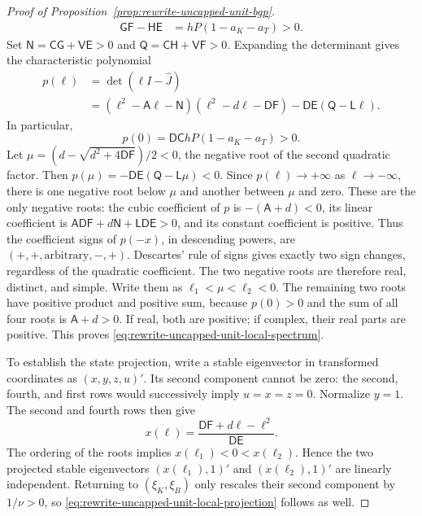 \begin{proof}[Proof of Proposition~\ref{prop:rewrite-uncapped-unit-bgp}]
\begin{align}
 \mathsf G\mathsf F-\mathsf H\mathsf E
 &=hP(1-a_K-a_T)>0.
 \label{eq:rewrite-uncapped-unit-local-minor}
\end{align}
Set $\mathsf N=\mathsf C\mathsf G+\mathsf V\mathsf E>0$ and
$\mathsf Q=\mathsf C\mathsf H+\mathsf V\mathsf F>0$.
Expanding the determinant gives the characteristic polynomial
\begin{equation}
 \begin{split}
 p(\ell)&=\det(\ell I-\widehat J)\\
 &=(\ell^2-\mathsf A\ell-\mathsf N)
 (\ell^2-d\ell-\mathsf D\mathsf F)
 -\mathsf D\mathsf E(\mathsf Q-\mathsf L\ell).
 \end{split}
 \label{eq:rewrite-uncapped-unit-local-polynomial}
\end{equation}
In particular,
\[
 p(0)=\mathsf D\mathsf C hP(1-a_K-a_T)>0.
\]
Let $\mu=(d-\sqrt{d^2+4\mathsf D\mathsf F})/2<0$, the negative
root of the second quadratic factor. Then
$p(\mu)=-\mathsf D\mathsf E(\mathsf Q-\mathsf L\mu)<0$.
Since $p(\ell)\to+\infty$ as $\ell\to-\infty$, there is one
negative root below $\mu$ and another between $\mu$ and zero.
These are the only negative roots: the cubic coefficient of $p$ is
$-(\mathsf A+d)<0$, its linear coefficient is
$\mathsf A\mathsf D\mathsf F+d\mathsf N+\mathsf L\mathsf D\mathsf E>0$,
and its constant coefficient is positive. Thus the coefficient signs of
$p(-x)$, in descending powers, are $(+,+,\text{arbitrary},-,+)$.
Descartes' rule of signs gives exactly two sign changes, regardless of
the quadratic coefficient. The two negative roots are therefore real,
distinct, and simple. Write them as $\ell_1<\mu<\ell_2<0$.
The remaining two roots have positive product and positive sum, because
$p(0)>0$ and the sum of all four roots is $\mathsf A+d>0$.
If real, both are positive; if complex, their real parts are positive.
This proves \eqref{eq:rewrite-uncapped-unit-local-spectrum}.

To establish the state projection, write a stable eigenvector in transformed
coordinates as $(x,y,z,u)'$. Its second component cannot be zero:
the second, fourth, and first rows would successively imply $u=x=z=0$.
Normalize $y=1$. The second and fourth rows then give
\[
 x(\ell)=\frac{\mathsf D\mathsf F+d\ell-\ell^2}{\mathsf D\mathsf E}.
\]
The ordering of the roots implies $x(\ell_1)<0<x(\ell_2)$.
Hence the two projected stable eigenvectors $(x(\ell_1),1)'$ and
$(x(\ell_2),1)'$ are linearly independent. Returning to $(\xi_K,\xi_B)$
only rescales their second component by $1/\nu>0$, so
\eqref{eq:rewrite-uncapped-unit-local-projection} follows as well.


\end{proof}
